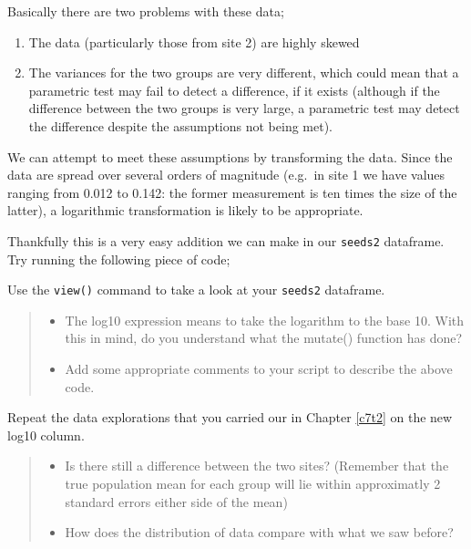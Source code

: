 \documentclass[
]{book}
\newenvironment{Shaded}{\begin{snugshade}}{\end{snugshade}}
\newcommand{\AttributeTok}[1]{\textcolor[rgb]{0.13,0.29,0.53}{#1}}
\newcommand{\FunctionTok}[1]{\textcolor[rgb]{0.13,0.29,0.53}{\textbf{#1}}}
\newcommand{\NormalTok}[1]{#1}
\newcommand{\OtherTok}[1]{\textcolor[rgb]{0.56,0.35,0.01}{#1}}
\newcommand{\SpecialCharTok}[1]{\textcolor[rgb]{0.81,0.36,0.00}{\textbf{#1}}}
\providecommand{\tightlist}{%
  \setlength{\itemsep}{0pt}\setlength{\parskip}{0pt}}
\begin{document}
Basically there are two problems with these data;

\begin{enumerate}
\def\labelenumi{\arabic{enumi})}
\tightlist
\item
  The data (particularly those from site 2) are highly skewed
\item
  The variances for the two groups are very different, which could mean that a parametric test may fail to detect a difference, if it exists (although if the difference between the two groups is very large, a parametric test may detect the difference despite the assumptions not being met).
\end{enumerate}

We can attempt to meet these assumptions by transforming the data. Since the data are spread over several orders of magnitude (e.g.~in site 1 we have values ranging from 0.012 to 0.142: the former measurement is ten times the size of the latter), a logarithmic transformation is likely to be appropriate.

Thankfully this is a very easy addition we can make in our \texttt{seeds2} dataframe. Try running the following piece of code;

\begin{Shaded}
\end{Shaded}

Use the \texttt{view()} command to take a look at your \texttt{seeds2} dataframe.

\begin{quote}
\begin{itemize}
\tightlist
\item
  The log10 expression means to take the logarithm to the base 10. With this in mind, do you understand what the mutate() function has done?
\item
  Add some appropriate comments to your script to describe the above code.
\end{itemize}
\end{quote}

Repeat the data explorations that you carried our in Chapter \ref{c7t2} on the new log10 column.

\begin{quote}
\begin{itemize}
\tightlist
\item
  Is there still a difference between the two sites? (Remember that the true population mean for each group will lie within approximatly 2 standard errors either side of the mean)
\item
  How does the distribution of data compare with what we saw before?
\end{itemize}
\end{quote}
\end{document}

